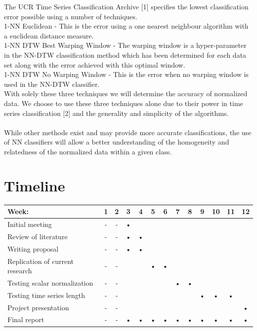 \documentclass[10pt,a4paper]{article}
\begin{document}
The UCR Time Series Classification Archive [1] specifies the lowest classification error possible using a number of techniques.\\
1-NN Euclidean - This is the error using a one nearest neighbour algorithm with a euclidean distance measure.\\
1-NN DTW Best Warping Window - The warping window is a hyper-parameter in the NN-DTW classification method which has been determined for each data set along with the error achieved with this optimal window.\\
1-NN DTW No Warping Window - This is the error when no warping window is used in the NN-DTW classifier.\\
With solely these three techniques we will determine the accuracy of normalized data.
We choose to use these three techniques alone due to their power in time series classification [2] and the generality and simplicity of the algorithms.
\\\\
While other methods exist and may provide more accurate classifications, the use of NN classifiers will allow a better understanding of the homogeneity and relatedness of the normalized data within a given class.

\section{Timeline}
\begin{tabular}{|l|c|c|c|c|c|c|c|c|c|c|c|c|}
\hline 
Week: & 1 & 2 & 3 & 4 & 5 & 6 & 7 & 8 & 9 & 10 & 11 & 12 \\ 
\hline 
Initial meeting & - & - & • &  &  &  &  &  &  &  &  &  \\ 
\hline 
Review of literature & - & - & • & • &  &  &  &  &  &  &  &  \\ 
\hline 
Writing proposal & - & - & • & • &  &  &  &  &  &  &  &  \\ 
\hline 
Replication of current research & - & - &  &  & • & • &  &  &  &  &  &  \\ 
\hline 
Testing scalar normalization & - & - &  &  &  &  & • & • &  &  &  &  \\ 
\hline 
Testing time series length & - & - &  &  &  &  &  &  & • & • & • &  \\ 
\hline 
Project presentation & - & - &  &  &  &  &  &  &  &  &  & • \\ 
\hline 
Final report & - & - & • & • & • & • & • & • & • & • & • & • \\ 
\hline 
\end{tabular}
\end{document}
